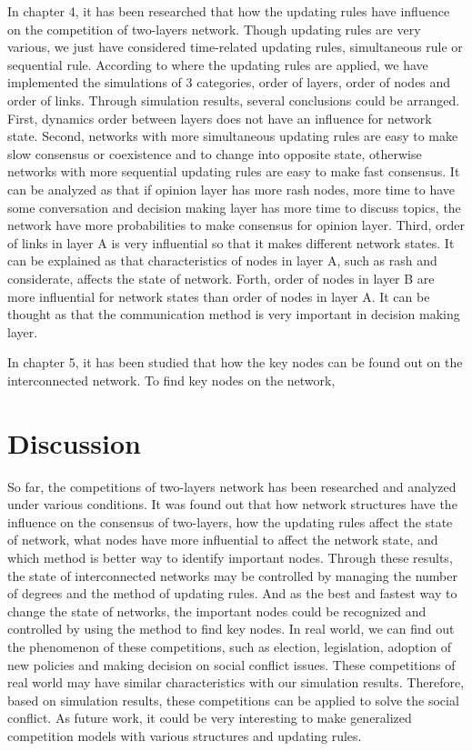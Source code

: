 In chapter 4, it has been researched that how the updating rules have influence on the competition of two-layers network. Though updating rules are very various, we just have considered time-related updating rules, simultaneous rule or sequential rule. According to where the updating rules are applied, we have implemented the simulations of 3 categories, order of layers, order of nodes and order of links. Through simulation results, several conclusions could be arranged.
First, dynamics order between layers does not have an influence for network state. Second, networks with more simultaneous updating rules are easy to make slow consensus or coexistence and to change into opposite state, otherwise networks with more sequential updating rules are easy to make fast consensus. It can be analyzed as that if opinion layer has more rash nodes, more time to have some conversation and decision making layer has more time to  discuss topics, the network have more probabilities to make consensus for opinion layer. Third, order of links in layer A is very influential so that it makes different network states. It can be explained as that characteristics of nodes in layer A, such as rash and considerate, affects the state of network. Forth, order of nodes in layer B are more influential for network states than order of nodes in layer A. It can be thought as that the communication method is very important in decision making layer. 


In chapter 5, it has been studied that how the key nodes can be found out on the interconnected network. To find key nodes on the network, 

\section{Discussion} 
So far, the competitions of two-layers network has been researched and analyzed  under various conditions. It was found out that how network structures have the influence on the consensus of two-layers, how the updating rules affect the state of network, what nodes have more influential to affect the network state, and which method is better way to identify important nodes. Through these results, the state of interconnected networks may be controlled by managing the number of degrees and the method of updating rules. And as the best and fastest way to change the state of networks, the important nodes could be recognized and controlled by using the method to find key nodes.
In real world, we can find out the phenomenon of these competitions, such as election, legislation, adoption of new policies and making decision on social conflict issues. These competitions of real world may have similar characteristics with our simulation results. Therefore, based on simulation results, these competitions can be applied to solve the social conflict. As future work, it could be very interesting to make generalized competition models with various structures and updating rules.   

